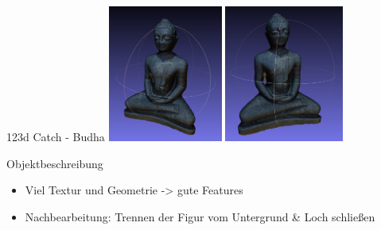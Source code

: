 \documentclass[11pt]{beamer}
\begin{document}
\begin{frame}{123d Catch - Budha}
\center
	\includegraphics[height=4.5cm]{images/budha/Budha_SfM_Textured.png}
	\includegraphics[height=4.5cm]{images/budha/Budha_SfM_Textured_2.png}
	\begin{block}{Objektbeschreibung}
		\begin{itemize}
			\item Viel Textur und Geometrie -> gute Features
			\item Nachbearbeitung: Trennen der Figur vom Untergrund \& Loch schließen
		\end{itemize}
	\end{block}
\end{frame}
\end{document}
